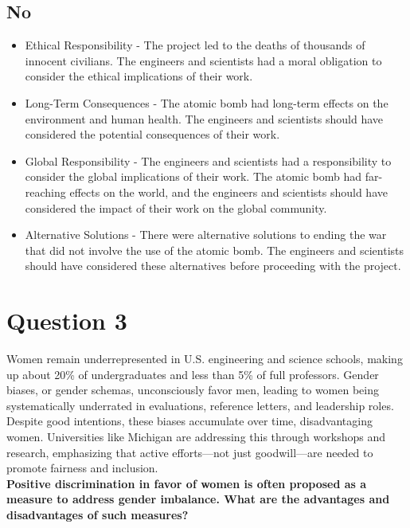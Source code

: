 \documentclass{article}
\begin{document}
\subsection{No}
\begin{itemize}
    \item Ethical Responsibility - The project led to the deaths of thousands of innocent civilians. The engineers and scientists had a moral obligation to consider the ethical implications of their work.
    \item Long-Term Consequences - The atomic bomb had long-term effects on the environment and human health. The engineers and scientists should have considered the potential consequences of their work.
    \item Global Responsibility - The engineers and scientists had a responsibility to consider the global implications of their work. The atomic bomb had far-reaching effects on the world, and the engineers and scientists should have considered the impact of their work on the global community.
    \item Alternative Solutions - There were alternative solutions to ending the war that did not involve the use of the atomic bomb. The engineers and scientists should have considered these alternatives before proceeding with the project.
\end{itemize}

\section{Question 3}
Women remain underrepresented in U.S. engineering and science schools, making up about 20\% of undergraduates and less than 5\% of full professors. Gender biases, or gender schemas, unconsciously favor men, leading to women being systematically underrated in evaluations, reference letters, and leadership roles. Despite good intentions, these biases accumulate over time, disadvantaging women. Universities like Michigan are addressing this through workshops and research, emphasizing that active efforts—not just goodwill—are needed to promote fairness and inclusion.\\

\textbf{Positive discrimination in favor of women is often proposed as a measure to address gender imbalance. What are the advantages and disadvantages of such measures?}
\end{document}
